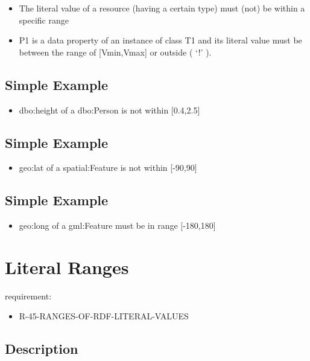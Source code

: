\documentclass{llncs}
\begin{document}
\begin{itemize}
	\item The literal value of a resource (having a certain type) must (not) be within a specific range
  \item P1 is a data property of an instance of class T1 and its literal value must be between the range of [Vmin,Vmax] or outside ( ‘!' ).
\end{itemize}

\subsection{Simple Example}

\begin{itemize}
	\item dbo:height of a dbo:Person is not within [0.4,2.5]
\end{itemize}

\subsection{Simple Example}

\begin{itemize}
	\item geo:lat of a spatial:Feature is not within [-90,90]
\end{itemize}

\subsection{Simple Example}

\begin{itemize}
	\item geo:long of a gml:Feature must be in range [-180,180]
\end{itemize}



\section{Literal Ranges}

requirement:

\begin{itemize}
	\item R-45-RANGES-OF-RDF-LITERAL-VALUES
\end{itemize}

\subsection{Description}
\end{document}
